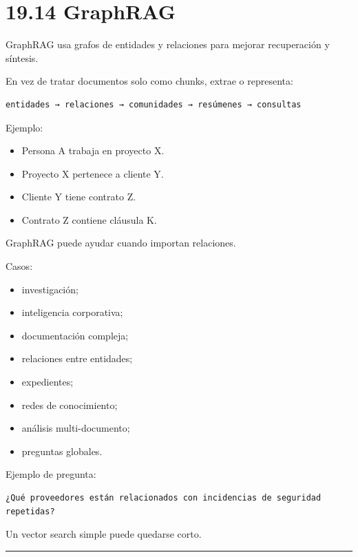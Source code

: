\section{19.14 GraphRAG}\label{graphrag}

GraphRAG usa grafos de entidades y relaciones para mejorar recuperación
y síntesis.

En vez de tratar documentos solo como chunks, extrae o representa:

\begin{lstlisting}
entidades → relaciones → comunidades → resúmenes → consultas
\end{lstlisting}

Ejemplo:

\begin{itemize}
\tightlist
\item
  Persona A trabaja en proyecto X.
\item
  Proyecto X pertenece a cliente Y.
\item
  Cliente Y tiene contrato Z.
\item
  Contrato Z contiene cláusula K.
\end{itemize}

GraphRAG puede ayudar cuando importan relaciones.

Casos:

\begin{itemize}
\tightlist
\item
  investigación;
\item
  inteligencia corporativa;
\item
  documentación compleja;
\item
  relaciones entre entidades;
\item
  expedientes;
\item
  redes de conocimiento;
\item
  análisis multi-documento;
\item
  preguntas globales.
\end{itemize}

Ejemplo de pregunta:

\begin{lstlisting}
¿Qué proveedores están relacionados con incidencias de seguridad repetidas?
\end{lstlisting}

Un vector search simple puede quedarse corto.

\begin{center}\rule{0.5\linewidth}{0.5pt}\end{center}

